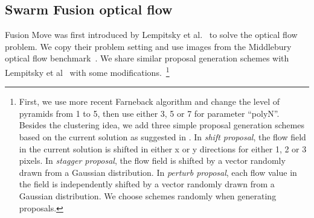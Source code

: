 \subsection{Swarm Fusion optical flow}
Fusion Move was first introduced by Lempitsky et al.~\cite{fusion_flow} to
solve the optical flow problem.
We copy their problem setting and use images from the Middlebury optical
flow benchmark~\cite{middlebury_optical_flow}. We share similar proposal
generation schemes with Lempitsky et al~\cite{fusion_flow}
 with some modifications.~\footnote{First, we use more recent
   Farneback algorithm and change the level of pyramids from 1 to 5,
   then use either 3, 5 or 7 for parameter ``polyN''. Besides the
   clustering idea, we add three simple proposal generation schemes
   based on the current solution as suggested in
   \cite{fusion_flow}. In \textit{shift proposal}, the flow field in
   the current solution is shifted in either x or y directions for
   either 1, 2 or 3 pixels. In \textit{stagger proposal}, the flow
   field is shifted by a vector randomly drawn from a Gaussian
   distribution. In \textit{perturb proposal}, each flow value in the
   field is independently shifted by a vector randomly drawn from a
   Gaussian distribution. We choose schemes randomly when generating
   proposals.}


